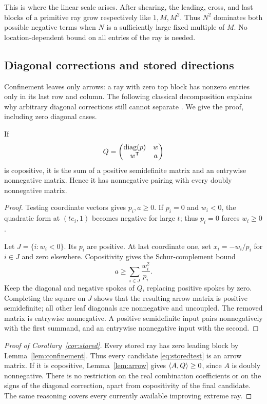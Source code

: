 This is where the linear scale arises. After shearing, the leading, cross, and last blocks of a primitive ray grow respectively like $1,M,M^2$. Thus $N^2$ dominates both possible negative terms when $N$ is a sufficiently large fixed multiple of $M$. No location-dependent bound on all entries of the ray is needed.

\subsection{Diagonal corrections and stored directions}
Confinement leaves only arrows: a ray with zero top block has nonzero entries only in its last row and column. The following classical decomposition explains why arbitrary diagonal corrections still cannot separate \cite[Theorem~5.4]{SPN}. We give the proof, including zero diagonal cases.

\begin{lemma}\label{lem:arrow}
If
\[
 Q=\begin{pmatrix}\operatorname{diag}(p)&w\\w^{\mathsf T}&a\end{pmatrix}
\]
is copositive, it is the sum of a positive semidefinite matrix and an entrywise nonnegative matrix. Hence it has nonnegative pairing with every doubly nonnegative matrix.
\end{lemma}
\begin{proof}
Testing coordinate vectors gives $p_i,a\ge0$. If $p_i=0$ and $w_i<0$, the quadratic form at $(te_i,1)$ becomes negative for large $t$; thus $p_i=0$ forces $w_i\ge0$.

Let $J=\{i:w_i<0\}$. Its $p_i$ are positive. At last coordinate one, set $x_i=-w_i/p_i$ for $i\in J$ and zero elsewhere. Copositivity gives the Schur-complement bound
\[
 a\ge\sum_{i\in J}\frac{w_i^2}{p_i}.
\]
Keep the diagonal and negative spokes of $Q$, replacing positive spokes by zero. Completing the square on $J$ shows that the resulting arrow matrix is positive semidefinite; all other leaf diagonals are nonnegative and uncoupled. The removed matrix is entrywise nonnegative. A positive semidefinite input pairs nonnegatively with the first summand, and an entrywise nonnegative input with the second.
\end{proof}

\begin{proof}[Proof of Corollary~\ref{cor:stored}]
Every stored ray has zero leading block by Lemma~\ref{lem:confinement}. Thus every candidate \eqref{eq:storedtest} is an arrow matrix. If it is copositive, Lemma~\ref{lem:arrow} gives $\langle A,Q\rangle\ge0$, since $A$ is doubly nonnegative. There is no restriction on the real combination coefficients or on the signs of the diagonal correction, apart from copositivity of the final candidate. The same reasoning covers every currently available improving extreme ray.
\end{proof}

